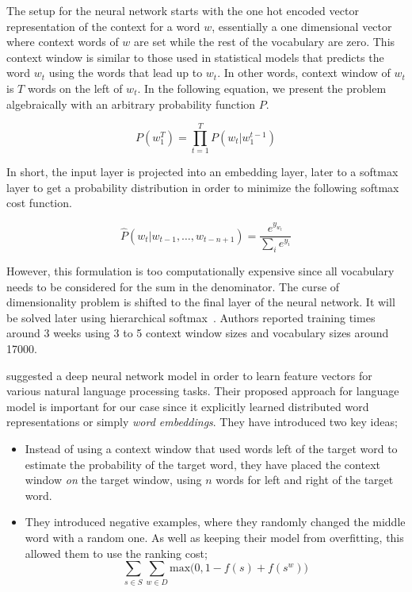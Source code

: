 The setup for the neural network starts with the one hot encoded vector representation of the context for a word $w$, essentially a one dimensional vector where context words of $w$ are set while the rest of the vocabulary are zero.
This context window is similar to those used in statistical models that predicts the word $w_t$ using the words that lead up to $w_t$.
In other words, context window of $w_t$ is $T$ words on the left of $w_t$.
In the following equation, we present the problem algebraically with an arbitrary probability function $P$.

\begin{displaymath}
    P(w_1^T) = \prod_{t=1}^{T}P(w_t | w_{1}^{t-1})
\end{displaymath}

In short, the input layer is projected into an embedding layer, later to a softmax layer to get a probability distribution in order to minimize the following softmax cost function.

\begin{equation}%
    \label{eqn:bengio_softmax}
    \hat{P}(w_t|w_{t-1}, \dots, w_{t-n+1}) = \frac{e^{y_{w_{t}}}}{\sum_{i}e^{y_{i}}}
\end{equation}

However, this formulation is too computationally expensive since all vocabulary needs to be considered for the sum in the denominator.
The curse of dimensionality problem is shifted to the final layer of the neural network.
It will be solved later using hierarchical softmax~\cite{mikolovDistributed2013}.
Authors reported training times around 3 weeks using 3 to 5 context window sizes and vocabulary sizes around 17000.

\textcite{collobert_unified_2008} suggested a deep neural network model in order to learn feature vectors for various natural language processing tasks.
Their proposed approach for language model is important for our case since it explicitly learned distributed word representations or simply \emph{word embeddings}.
They have introduced two key ideas;
\begin{itemize}
    \item Instead of using a context window that used words left of the target word to estimate the probability of the target word, they have placed the context window \emph{on} the target window, using $n$ words for left and right of the target word.
    \item They introduced negative examples, where they randomly changed the middle word with a random one. As well as keeping their model from overfitting, this allowed them to use the ranking cost;
        \begin{displaymath}
            \sum_{s \in S} \sum_{w \in D} \text{max}\big( 0, 1 - f(s) + f(s^w)\big)
        \end{displaymath}
\end{itemize}

